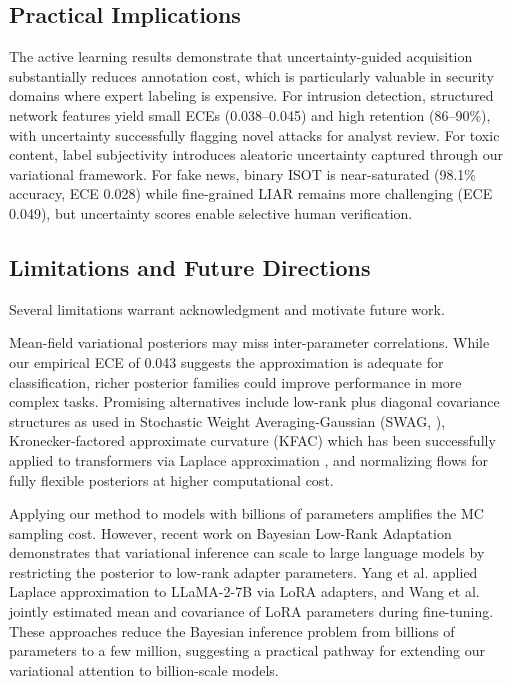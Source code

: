 \documentclass[12pt,a4paper]{article}
\theoremstyle{definition}
\begin{document}
\subsection{Practical Implications}

The active learning results demonstrate that uncertainty-guided acquisition substantially reduces annotation cost, which is particularly valuable in security domains where expert labeling is expensive. For intrusion detection, structured network features yield small ECEs (0.038--0.045) and high retention (86--90\%), with uncertainty successfully flagging novel attacks for analyst review. For toxic content, label subjectivity introduces aleatoric uncertainty captured through our variational framework. For fake news, binary ISOT is near-saturated (98.1\% accuracy, ECE 0.028) while fine-grained LIAR remains more challenging (ECE 0.049), but uncertainty scores enable selective human verification.

\subsection{Limitations and Future Directions}

Several limitations warrant acknowledgment and motivate future work.

Mean-field variational posteriors may miss inter-parameter correlations. While our empirical ECE of 0.043 suggests the approximation is adequate for classification, richer posterior families could improve performance in more complex tasks. Promising alternatives include low-rank plus diagonal covariance structures as used in Stochastic Weight Averaging-Gaussian (SWAG, \citealt{maddox2019simple}), Kronecker-factored approximate curvature (KFAC) which has been successfully applied to transformers via Laplace approximation \citep{daxberger2021laplace}, and normalizing flows for fully flexible posteriors at higher computational cost.

Applying our method to models with billions of parameters amplifies the MC sampling cost. However, recent work on Bayesian Low-Rank Adaptation demonstrates that variational inference can scale to large language models by restricting the posterior to low-rank adapter parameters. Yang et al. \citep{yang2024laplace} applied Laplace approximation to LLaMA-2-7B via LoRA adapters, and Wang et al. \citep{wang2024blob} jointly estimated mean and covariance of LoRA parameters during fine-tuning. These approaches reduce the Bayesian inference problem from billions of parameters to a few million, suggesting a practical pathway for extending our variational attention to billion-scale models.
\end{document}
